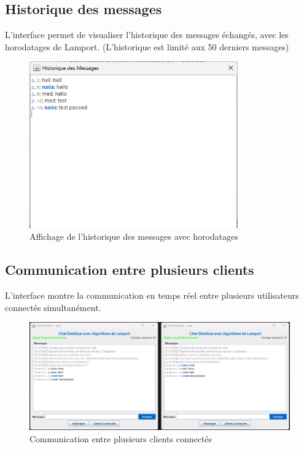 \documentclass[a4paper,12pt]{article}
\begin{document}
\subsection{Historique des messages}
L'interface permet de visualiser l'historique des messages échangés, avec les horodatages de Lamport.
(L'historique est limité aux 50 derniers messages)
\begin{figure}[ht!]
    \centering
    \includegraphics[width=0.8\textwidth]{history.png}
    \caption{Affichage de l'historique des messages avec horodatages}
\end{figure}
\FloatBarrier
\subsection{Communication entre plusieurs clients}
L'interface montre la communication en temps réel entre plusieurs utilisateurs connectés simultanément.

\begin{figure}[ht!]
    \centering
    \includegraphics[width=1\textwidth]{twoClients.png}
    \caption{Communication entre plusieurs clients connectés}
\end{figure}
\FloatBarrier
\end{document}
